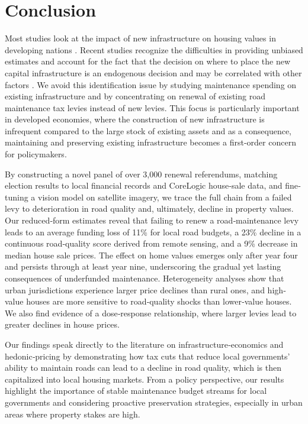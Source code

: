 \section{Conclusion} \label{sec:conclusion}

Most studies look at the impact of new infrastructure on housing values in developing nations \citep{asher2020, huang2016understanding,li2016wheels}. 
Recent studies recognize the difficulties in providing unbiased estimates and account for the fact that the decision on where to place the new capital infrastructure is an endogenous decision and may be correlated with other factors \citep{biasi_what_2025, donaldson2016railroads}.
We avoid this identification issue by studying maintenance spending on existing infrastructure and by concentrating on renewal of existing road maintenance tax levies instead of new levies. This focus is particularly important in developed economies, where the construction of new infrastructure is infrequent compared to the large stock of existing assets and as a consequence, maintaining and preserving existing infrastructure becomes a first-order concern for policymakers.


By constructing a novel panel of over 3,000 renewal referendums, matching election results to local financial records and CoreLogic house‐sale data, and fine‐tuning a vision model on satellite imagery, we trace the full chain from a failed levy to deterioration in road quality and, ultimately, decline in property values. Our reduced‐form estimates reveal that failing to renew a road‐maintenance levy leads to an average funding loss of 11\% for local road budgets, a 23\% decline in a continuous road‐quality score derived from remote sensing, and a 9\% decrease in median house sale prices. The effect on home values emerges only after year four and persists through at least year nine, underscoring the gradual yet lasting consequences of underfunded maintenance.
Heterogeneity analyses show that urban jurisdictions experience larger price declines than rural ones, and high‐value houses are more sensitive to road‐quality shocks than lower‐value houses. We also find evidence of a dose‐response relationship, where larger levies lead to greater declines in house prices. 


Our findings speak directly to the literature on infrastructure‐economics and hedonic‐pricing by demonstrating how tax cuts that reduce local governments’ ability to maintain roads can lead to a decline in road quality, which is then capitalized into local housing markets. From a policy perspective, our results highlight the importance of stable maintenance budget streams for local governments and considering proactive preservation strategies, especially in urban areas where property stakes are high.


